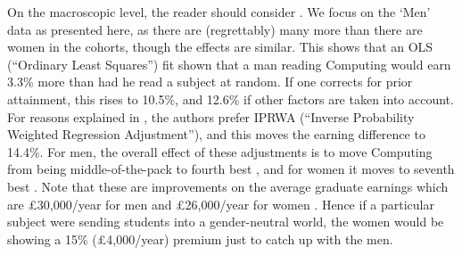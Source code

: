 \documentclass[sigconf]{acmart}
\begin{document}
On the macroscopic level, the reader should consider \cite[Table 5]{DfE2018d}. We focus on the `Men' data as presented here, as there are (regrettably) many more than there are women in the cohorts, though the effects are similar. This shows that an OLS (``Ordinary Least Squares'') fit shown that a man reading Computing would earn 3.3\% more than had he read a subject at random. If one corrects for prior attainment, this rises to 10.5\%, and 12.6\% if other factors are taken into account. For reasons explained in \cite[\S4.2]{DfE2018d}, the authors prefer IPRWA (``Inverse Probability Weighted Regression Adjustment''), and this moves the earning difference to 14.4\%. For men, the overall effect of these adjustments is to move Computing from being middle-of-the-pack \cite[Figure 15]{DfE2018d} to fourth best  \cite[Figure 17]{DfE2018d}, and for women it moves to seventh best  \cite[Figure 16]{DfE2018d}. Note that these are improvements on the average graduate earnings which are \pounds30,000/year for men and \pounds26,000/year for women \cite[p. 37]{DfE2018d}. Hence if a particular subject were sending students into a gender-neutral world, the women would be showing a 15\% (\pounds4,000/year) premium just to catch up with the men.
\end{document}
